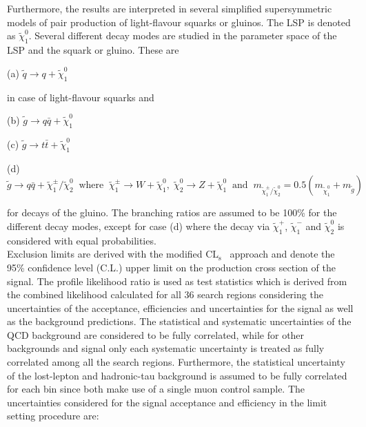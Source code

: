 \\
\\
Furthermore, the results are interpreted in several simplified supersymmetric models of pair production of light-flavour squarks or gluinos. The LSP is denoted as $\tilde{\chi}_1^0$. Several different decay modes are studied in the parameter space of the LSP and the squark or gluino. These are
\begin{description}
\item (a) $\tilde{q} \rightarrow q + \tilde{\chi}_1^0$
\end{description} 
in case of light-flavour squarks and
\begin{description}
\item (b) $\tilde{g} \rightarrow q\bar{q} + \tilde{\chi}_1^0$
\item (c) $\tilde{g} \rightarrow t\bar{t} + \tilde{\chi}_1^0$
\item (d) $\tilde{g} \rightarrow q\bar{q} + \tilde{\chi}_1^{\pm}/\tilde{\chi}_2^0 \;\; \mathrm{where} \;\; \tilde{\chi}_1^{\pm} \rightarrow W + \tilde{\chi}_1^0, \; \tilde{\chi}_2^0 \rightarrow Z + \tilde{\chi}_1^0 \;\; \mathrm{and} \;\; m_{\tilde{\chi}_1^{\pm}/\tilde{\chi}_2^0} = 0.5(m_{{\tilde{\chi}^0_1}} + m_{\tilde{g}})$ 
\end{description}  
for decays of the gluino. The branching ratios are assumed to be 100\% for the different decay modes, except for case (d) where the decay via $\tilde{\chi}_1^{+}$, $\tilde{\chi}_1^{-}$ and $\tilde{\chi}_2^0$ is considered with equal probabilities. \\
Exclusion limits are derived with the modified $\mathrm{CL_s}$~\cite{0954-3899-28-10-313, Thomas1999435, bib:Higgs:CLS} approach and denote the 95\% confidence level (C.L.) upper limit on the production cross section of the signal. The profile likelihood ratio is used as test statistics which is derived from the combined likelihood calculated for all 36 search regions considering the uncertainties of the acceptance, efficiencies and uncertainties for the signal as well as the background predictions. The statistical and systematic uncertainties of the QCD background are considered to be fully correlated, while for other backgrounds and signal only each systematic uncertainty is treated as fully correlated among all the search regions. Furthermore, the statistical uncertainty of the lost-lepton and hadronic-tau background is assumed to be fully correlated for each bin since both make use of a single muon control sample. The uncertainties considered for the signal acceptance and efficiency in the limit setting procedure are:  
